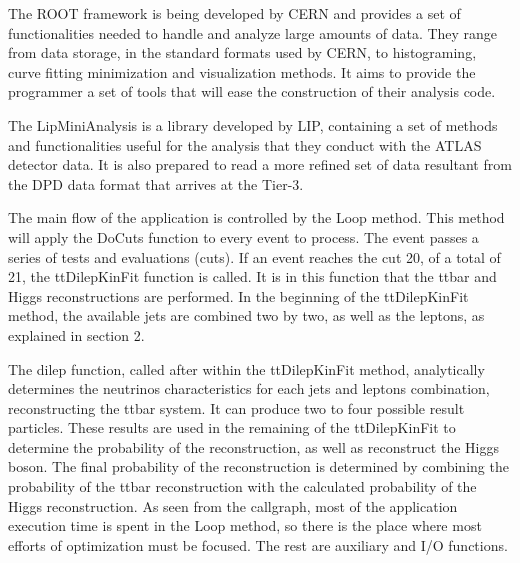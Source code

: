 The ROOT framework is being developed by CERN and provides a set of functionalities needed to handle and analyze large amounts of data. They range from data storage, in the standard formats used by CERN, to histograming, curve fitting minimization and visualization methods. It aims to provide the programmer a set of tools that will ease the construction of their analysis code.

The LipMiniAnalysis is a library developed by LIP, containing a set of methods and functionalities useful for the analysis that they conduct with the ATLAS detector data. It is also prepared to read a more refined set of data resultant from the DPD data format that arrives at the Tier-3.

The main flow of the application is controlled by the Loop method. This method will apply the DoCuts function to every event to process. The event passes a series of tests and evaluations (cuts). If an event reaches the cut 20, of a total of 21, the ttDilepKinFit function is called. It is in this function that the ttbar and Higgs reconstructions are performed. In the beginning of the ttDilepKinFit method, the available jets are combined two by two, as well as the leptons, as explained in section 2.

The dilep function, called after within the ttDilepKinFit method, analytically determines the neutrinos characteristics for each jets and leptons combination, reconstructing the ttbar system. It can produce two to four possible result particles. These results are used in the remaining of the ttDilepKinFit to determine the probability of the reconstruction, as well as reconstruct the Higgs boson. The final probability of the reconstruction is determined by combining the probability of the ttbar reconstruction with the calculated probability of the Higgs reconstruction.
As seen from the callgraph, most of the application execution time is spent in the Loop method, so there is the place where most efforts of optimization must be focused. The rest are auxiliary and I/O functions.

\newpage

